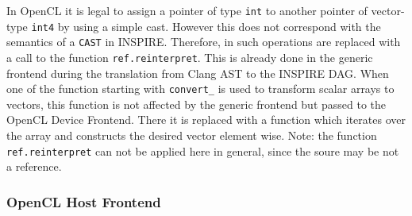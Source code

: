 In OpenCL it is legal to assign a pointer of type \texttt{int} to another pointer of vector-type \texttt{int4} by using a simple cast. However this does not correspond with the semantics of a \texttt{CAST} in INSPIRE. Therefore, in such operations are replaced with a call to the function \texttt{ref.reinterpret}. This is already done in the generic frontend during the translation from Clang AST to the INSPIRE DAG. When one of the function starting with \texttt{convert\_} is used to transform scalar arrays to vectors, this function is not affected by the generic frontend but passed to the OpenCL Device Frontend. There it is replaced with a function which iterates over the array and constructs the desired vector element wise. Note: the function \texttt{ref.reinterpret} can not be applied here in general, since the soure may be not a reference.




\subsubsection{OpenCL Host Frontend}
\label{sec:Insieme.HostCL}

